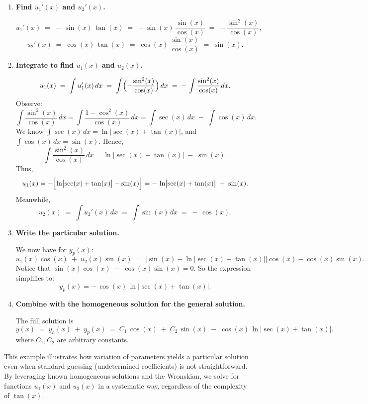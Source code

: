 \begin{example}
\begin{solution}
\begin{enumerate}
\item \textbf{Find \(u_1'(x)\) and \(u_2'(x)\).}

   \[
   u_1'(x)
   \;=\;
   -\,\sin(x)\,\tan(x)
   \;=\;
   -\sin(x)\,\frac{\sin(x)}{\cos(x)}
   \;=\;
   -\frac{\sin^2(x)}{\cos(x)},
   \]
   \[
   u_2'(x)
   \;=\;
   \cos(x)\,\tan(x)
   \;=\;
   \cos(x)\,\frac{\sin(x)}{\cos(x)}
   \;=\;
   \sin(x).
   \]

\item \textbf{Integrate to find \(u_1(x)\) and \(u_2(x)\).}

   \[
   u_1(x)
   \;=\;
   \int
   u_1'(x)\,dx
   \;=\;
   \int
   \Bigl(-\frac{\sin^2(x)}{\cos(x)}\Bigr)\,dx
   \;=\;
   -\,\int \frac{\sin^2(x)}{\cos(x)}\,dx.
   \]
   Observe:
   \[
   \int \frac{\sin^2(x)}{\cos(x)}\,dx
   =
   \int \frac{1 - \cos^2(x)}{\cos(x)}\,dx
   =
   \int \sec(x)\,dx
   \;-\;
   \int \cos(x)\,dx.
   \]
   We know \(\int \sec(x)\,dx = \ln\bigl|\sec(x) + \tan(x)\bigr|\), and \(\int \cos(x)\,dx = \sin(x)\). Hence,
   \[
   \int \frac{\sin^2(x)}{\cos(x)}\,dx
   =
   \ln\bigl|\sec(x) + \tan(x)\bigr|
   \;-\;
   \sin(x).
   \]
   Thus,
   \[
   u_1(x)
   =
   -\Bigl[\ln\bigl|\sec(x) + \tan(x)\bigr| - \sin(x)\Bigr]
   =
   -\,\ln\bigl|\sec(x) + \tan(x)\bigr|
   \;+\;
   \sin(x).
   \]
   Meanwhile,
   \[
   u_2(x)
   \;=\;
   \int
   u_2'(x)\,dx
   \;=\;
   \int \sin(x)\,dx
   \;=\;
   -\,\cos(x).
   \]

\item \textbf{Write the particular solution.}

   We now have for $y_p(x)$:
   \[
   u_1(x)\cos(x) \;+\; u_2(x)\sin(x)
   \;=\;
   \bigl[\sin(x) - \ln|\sec(x) + \tan(x)|\bigr]\cos(x)
   -\cos(x)\sin(x).
   \]
   Notice that
   \(\sin(x)\cos(x)\;-\;\cos(x)\sin(x) = 0\).
   So the expression simplifies to:
   \[
   y_p(x)
   =
   -\,\cos(x)\,\ln\bigl|\sec(x) + \tan(x)\bigr|.
   \]

\item \textbf{Combine with the homogeneous solution for the general solution.}

   The full solution is
   \[
   y(x)
   \;=\;
   y_h(x) \;+\; y_p(x)
   \;=\;
   C_1\,\cos(x)
   \;+\;
   C_2\,\sin(x)
   \;-\;
   \cos(x)\,\ln\bigl|\sec(x) + \tan(x)\bigr|.
   \]
   where $C_1, C_2$ are arbitrary constants.
\end{enumerate}

\noindent This example illustrates how variation of parameters yields a particular solution even when standard guessing (undetermined coefficients) is not straightforward. By leveraging known homogeneous solutions and the Wronskian, we solve for functions $u_1(x)$ and $u_2(x)$ in a systematic way, regardless of the complexity of $\tan(x)$.
\end{solution}
\end{example}
\exampleline


